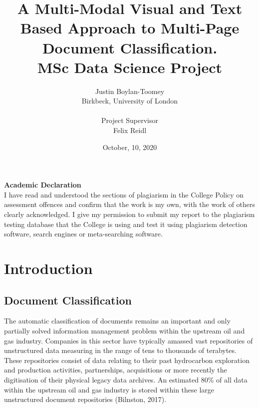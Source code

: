 \documentclass[a4paper,12pt]{article}
\begin{document}
\title{
	A  Multi-Modal Visual and Text Based Approach to Multi-Page Document Classification.\\
	\bigbreak
	\Large MSc Data Science Project
}

\author{Justin Boylan-Toomey \\ Birkbeck, University of London\\ \\Project Supervisor \\Felix Reidl }
\date{October, 10, 2020}
\maketitle

\newpage

\begin{center}
\noindent\textbf{Academic Declaration}\\
\noindent I have read and understood the sections of plagiarism in the College
Policy on assessment offences and confirm that the work is my own, with
the work of others clearly acknowledged. I give my permission to submit
my report to the plagiarism testing database that the College is using
and test it using plagiarism detection software, search engines or
meta-searching software.

\end{center}

\newpage

\tableofcontents

\newpage

\section{Introduction}
\subsection{Document Classification}

The automatic classification of documents remains an important and only partially solved information management problem within the upstream oil and gas industry. Companies in this sector have typically amassed vast repositories of unstructured data measuring in the range of tens to thousands of terabytes. These repositories consist of data relating to their past hydrocarbon exploration and production activities, partnerships, acquisitions or more recently the digitisation of their physical legacy data archives. An estimated 80\% of all data within the upstream oil and gas industry is stored within these large unstructured document repositories (Bilnston, 2017).\\
\end{document}
